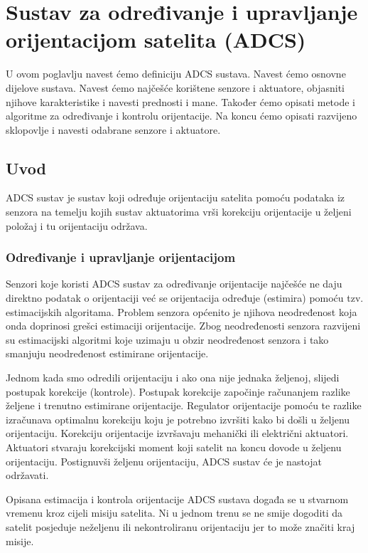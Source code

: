 \documentclass[times, utf8, diplomski, numeric]{templates/template}
\begin{document}

\chapter{Sustav za određivanje i upravljanje orijentacijom satelita (ADCS)}{
    U ovom poglavlju navest ćemo definiciju ADCS  sustava. Navest ćemo osnovne dijelove sustava. Navest ćemo najčešće korištene senzore i aktuatore, objasniti njihove karakteristike i navesti prednosti i mane. Također ćemo opisati metode i algoritme za određivanje i kontrolu orijentacije. Na koncu ćemo opisati razvijeno sklopovlje i navesti odabrane senzore i aktuatore. 

    \section{Uvod}{
        ADCS sustav je sustav koji određuje orijentaciju satelita pomoću podataka iz senzora na temelju kojih sustav aktuatorima vrši korekciju orijentacije u željeni položaj i tu orijentaciju održava. 

        \subsection{Određivanje i upravljanje orijentacijom}{
            Senzori koje koristi ADCS sustav za određivanje orijentacije najčešće ne daju direktno podatak o orijentaciji već se orijentacija određuje (estimira) pomoću tzv. estimacijskih algoritama. Problem senzora općenito je njihova neodređenost koja onda doprinosi grešci estimaciji orijentacije. Zbog neodređenosti senzora razvijeni su estimacijski algoritmi koje uzimaju u obzir neodređenost senzora i tako smanjuju neodređenost estimirane orijentacije.

            Jednom kada smo odredili orijentaciju i ako ona nije jednaka željenoj, slijedi postupak korekcije (kontrole). Postupak korekcije započinje računanjem razlike željene i trenutno estimirane orijentacije. Regulator orijentacije pomoću te razlike izračunava optimalnu korekciju koju je potrebno izvršiti kako bi došli u željenu orijentaciju. Korekciju orijentacije izvršavaju mehanički ili električni aktuatori. Aktuatori stvaraju korekcijski moment koji satelit na koncu dovode u željenu orijentaciju. Postignuvši željenu orijentaciju, ADCS sustav će je nastojat održavati.

            Opisana estimacija i kontrola orijentacije ADCS sustava događa se u stvarnom vremenu kroz cijeli misiju satelita. Ni u jednom trenu se ne smije dogoditi da satelit posjeduje neželjenu ili nekontroliranu orijentaciju jer to može značiti kraj misije.
        }

}}
\end{document}
